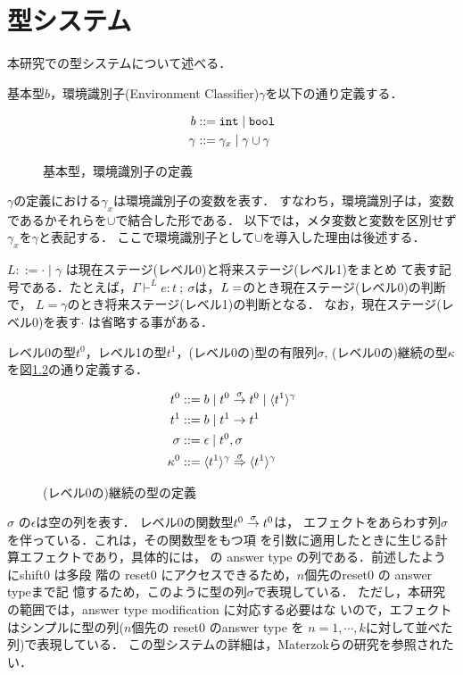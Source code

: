 \chapter{型システム}
\label{chap:type_system}

本研究での型システムについて述べる．

基本型$b$，環境識別子(Environment Classifier)$\gamma$を以下の通り定義する．

\begin{figure}[H]
  \centering
  \begin{align*}
    b & ::= \mbox{\texttt{int}} \mid \mbox{\texttt{bool}} \\
    \gamma & ::= \gamma_x \mid \gamma \cup \gamma
  \end{align*}
  \caption{基本型，環境識別子の定義}
  \label{fig:bec_def}
\end{figure}

$\gamma$の定義における$\gamma_x$は環境識別子の変数を表す．
すなわち，環境識別子は，変数であるかそれらを$\cup$で結合した形である．
以下では，メタ変数と変数を区別せず$\gamma_x$を$\gamma$と表記する．
ここで環境識別子として$\cup$を導入した理由は後述する．

$L ::= \cdot \mid \gamma$ は現在ステージ(レベル0)と将来ステージ(レベル1)をまとめ
て表す記号である．たとえば，$\Gamma \vdash^L
e:t~;~\sigma$は，$L=\empty$のとき現在ステージ(レベル0)の判断で，
$L=\gamma$のとき将来ステージ(レベル1)の判断となる．
なお，現在ステージ(レベル0)を表す$\cdot$ は省略する事がある．

レベル0の型$t^0$，レベル1の型$t^1$，(レベル0の)型の有限列$\sigma$,
(レベル0の)継続の型$\kappa$を図\ref{fig:k_def}の通り定義する．

\begin{figure}[H]
  \centering
  \begin{align*}
    t^0 & ::= b \mid {t^0} \stackrel{\sigma}{\rightarrow} {t^0} \mid \langle{t^1}\rangle^{\gamma} \\
    t^1 & ::= b \mid t^1 \to t^1 \\
    \sigma & ::= \epsilon \mid t^0, \sigma \\
    \kappa^0 & ::= {\langle{t^1}\rangle^{\gamma}} \stackrel{\sigma}{\Rightarrow} {\langle{t^1}\rangle^{\gamma}}
  \end{align*}
  \caption{(レベル0の)継続の型の定義}
  \label{fig:k_def}
\end{figure}

$\sigma$ の$\epsilon$は空の列を表す．
レベル0の関数型${t^0} \stackrel{\sigma}{\rightarrow} {t^0}$は，
エフェクトをあらわす列$\sigma$を伴っている．これは，その関数型をもつ項
を引数に適用したときに生じる計算エフェクトであり，具体的には，
\Shiftz の answer type の列である．前述したようにshift0 は多段
階の reset0 にアクセスできるため，$n$個先のreset0 の answer typeまで記
憶するため，このように型の列$\sigma$で表現している．
ただし，本研究の範囲では，answer type modification に対応する必要はな
いので，エフェクトはシンプルに型の列($n$個先の reset0 のanswer type を
$n=1,\cdots,k$に対して並べた列)で表現している．
この型システムの詳細は，Materzokら\cite{Materzok2011}の研究を参照されたい．


